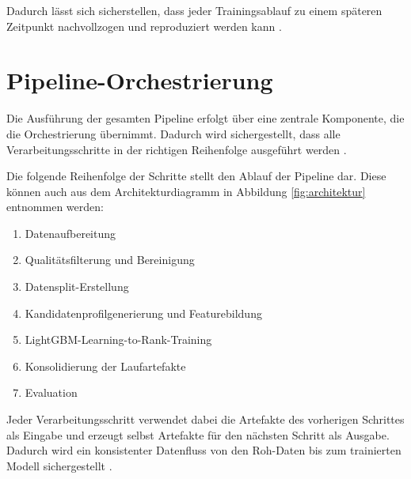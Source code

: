 Dadurch lässt sich sicherstellen, dass jeder Trainingsablauf zu einem späteren Zeitpunkt nachvollzogen und reproduziert werden kann \parencite{srcStep931}.


\section{Pipeline-Orchestrierung}

Die Ausführung der gesamten Pipeline erfolgt über eine zentrale Komponente, die die Orchestrierung übernimmt. 
Dadurch wird sichergestellt, dass alle Verarbeitungsschritte in der richtigen Reihenfolge ausgeführt werden \parencite{srcStep936}.

Die folgende Reihenfolge der Schritte stellt den Ablauf der Pipeline dar. Diese können auch aus dem Architekturdiagramm in Abbildung \ref{fig:architektur} entnommen werden:

\begin{enumerate} 
    \item Datenaufbereitung 
    \item Qualitätsfilterung und Bereinigung 
    \item Datensplit-Erstellung 
    \item Kandidatenprofilgenerierung und Featurebildung 
    \item LightGBM-Learning-to-Rank-Training 
    \item Konsolidierung der Laufartefakte 
    \item Evaluation 
\end{enumerate}

Jeder Verarbeitungsschritt verwendet dabei die Artefakte des vorherigen Schrittes als Eingabe und erzeugt selbst Artefakte für den nächsten Schritt als Ausgabe. 
Dadurch wird ein konsistenter Datenfluss von den Roh-Daten bis zum trainierten Modell sichergestellt \parencite{srcStep936,srcPipeline}.